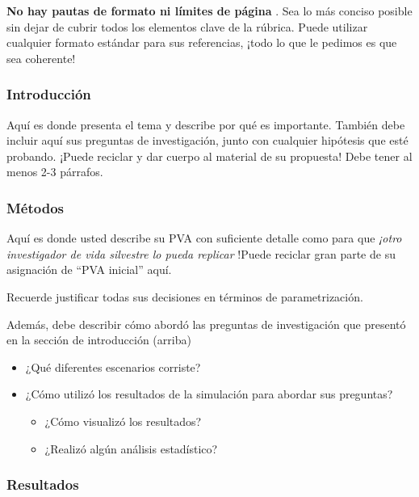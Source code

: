 \documentclass[
]{article}
\providecommand{\tightlist}{%
  \setlength{\itemsep}{0pt}\setlength{\parskip}{0pt}}
\begin{document}
\textbf{No hay pautas de formato ni límites de página }. Sea lo más
conciso posible sin dejar de cubrir todos los elementos clave de la
rúbrica. Puede utilizar cualquier formato estándar para sus referencias,
¡todo lo que le pedimos es que sea coherente!

\hypertarget{introducciuxf3n}{%
\subsubsection{Introducción}\label{introducciuxf3n}}

Aquí es donde presenta el tema y describe por qué es importante. También
debe incluir aquí sus preguntas de investigación, junto con cualquier
hipótesis que esté probando. ¡Puede reciclar y dar cuerpo al material de
su propuesta! Debe tener al menos 2-3 párrafos.

\hypertarget{muxe9todos}{%
\subsubsection{Métodos}\label{muxe9todos}}

Aquí es donde usted describe su PVA con suficiente detalle como para que
\emph{¡otro investigador de vida silvestre lo pueda replicar }!Puede
reciclar gran parte de su asignación de ``PVA inicial'' aquí.

Recuerde justificar todas sus decisiones en términos de parametrización.

Además, debe describir cómo abordó las preguntas de investigación que
presentó en la sección de introducción (arriba)

\begin{itemize}
\item
  ¿Qué diferentes escenarios corriste?
\item
  ¿Cómo utilizó los resultados de la simulación para abordar sus
  preguntas?

  \begin{itemize}
  \tightlist
  \item
    ¿Cómo visualizó los resultados?
  \item
    ¿Realizó algún análisis estadístico?
  \end{itemize}
\end{itemize}

\hypertarget{resultados}{%
\subsubsection{Resultados}\label{resultados}}
\end{document}
